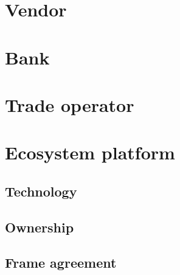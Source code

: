\section{Vendor}\label{protect_vendor}

\section{Bank}\label{protect_bank}

\section{Trade operator}\label{protect_trade_operator}

\section{Ecosystem platform}\label{protect_ecosystem_platform}

\subsection{Technology}\label{protect_technology}

\subsection{Ownership}\label{protect_ownership}

\subsection{Frame agreement}\label{protect_frame_agreement}

